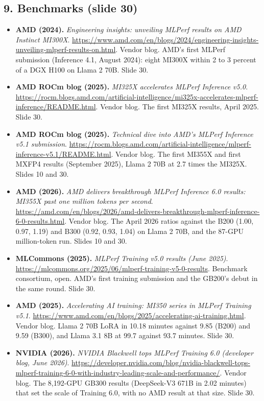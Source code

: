 \subsection*{9. Benchmarks (slide 30)}
\begin{itemize}[leftmargin=1.2em,itemsep=3pt]\sloppy
\item \textbf{AMD (2024).} \textit{Engineering insights: unveiling MLPerf results on AMD Instinct MI300X}. \url{https://www.amd.com/en/blogs/2024/engineering-insights-unveiling-mlperf-results-on.html}. Vendor blog. AMD's first MLPerf submission (Inference 4.1, August 2024): eight MI300X within 2 to 3 percent of a DGX H100 on Llama 2 70B. Slide 30.
\item \textbf{AMD ROCm blog (2025).} \textit{MI325X accelerates MLPerf Inference v5.0}. \url{https://rocm.blogs.amd.com/artificial-intelligence/mi325x-accelerates-mlperf-inference/README.html}. Vendor blog. The first MI325X results, April 2025. Slide 30.
\item \textbf{AMD ROCm blog (2025).} \textit{Technical dive into AMD's MLPerf Inference v5.1 submission}. \url{https://rocm.blogs.amd.com/artificial-intelligence/mlperf-inference-v5.1/README.html}. Vendor blog. The first MI355X and first MXFP4 results (September 2025), Llama 2 70B at 2.7 times the MI325X. Slides 10 and 30.
\item \textbf{AMD (2026).} \textit{AMD delivers breakthrough MLPerf Inference 6.0 results: MI355X past one million tokens per second}. \url{https://amd.com/en/blogs/2026/amd-delivers-breakthrough-mlperf-inference-6-0-results.html}. Vendor blog. The April 2026 ratios against the B200 (1.00, 0.97, 1.19) and B300 (0.92, 0.93, 1.04) on Llama 2 70B, and the 87-GPU million-token run. Slides 10 and 30.
\item \textbf{MLCommons (2025).} \textit{MLPerf Training v5.0 results (June 2025)}. \url{https://mlcommons.org/2025/06/mlperf-training-v5-0-results}. Benchmark consortium, open. AMD's first training submission and the GB200's debut in the same round. Slide 30.
\item \textbf{AMD (2025).} \textit{Accelerating AI training: MI350 series in MLPerf Training v5.1}. \url{https://www.amd.com/en/blogs/2025/accelerating-ai-training.html}. Vendor blog. Llama 2 70B LoRA in 10.18 minutes against 9.85 (B200) and 9.59 (B300), and Llama 3.1 8B at 99.7 against 93.7 minutes. Slide 30.
\item \textbf{NVIDIA (2026).} \textit{NVIDIA Blackwell tops MLPerf Training 6.0 (developer blog, June 2026)}. \url{https://developer.nvidia.com/blog/nvidia-blackwell-tops-mlperf-training-6-0-with-industry-leading-scale-and-performance/}. Vendor blog. The 8,192-GPU GB300 results (DeepSeek-V3 671B in 2.02 minutes) that set the scale of Training 6.0, with no AMD result at that size. Slide 30.
\end{itemize}
